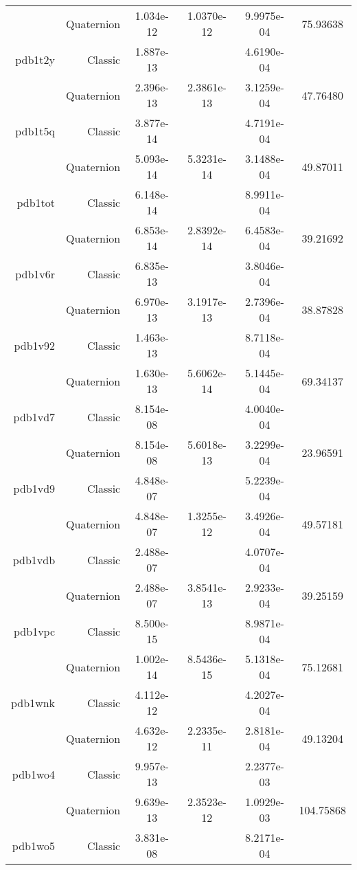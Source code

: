 \begin{xltabular}{\textwidth}{r|rS[table-format=1.3e+2]S[table-format=1.4e+2]S[table-format=1.4e+2]S[table-format=-1.5]}
& Quaternion & 1.034e-12 & 1.0370e-12 & 9.9975e-04 & 75.93638\\  \addlinespace
pdb1t2y & Classic & 1.887e-13 &  & 4.6190e-04 & \\
& Quaternion & 2.396e-13 & 2.3861e-13 & 3.1259e-04 & 47.76480\\  \addlinespace
pdb1t5q & Classic & 3.877e-14 &  & 4.7191e-04 & \\
& Quaternion & 5.093e-14 & 5.3231e-14 & 3.1488e-04 & 49.87011\\  \addlinespace
pdb1tot & Classic & 6.148e-14 &  & 8.9911e-04 & \\
& Quaternion & 6.853e-14 & 2.8392e-14 & 6.4583e-04 & 39.21692\\  \addlinespace
pdb1v6r & Classic & 6.835e-13 &  & 3.8046e-04 & \\
& Quaternion & 6.970e-13 & 3.1917e-13 & 2.7396e-04 & 38.87828\\  \addlinespace
pdb1v92 & Classic & 1.463e-13 &  & 8.7118e-04 & \\
& Quaternion & 1.630e-13 & 5.6062e-14 & 5.1445e-04 & 69.34137\\  \addlinespace
pdb1vd7 & Classic & 8.154e-08 &  & 4.0040e-04 & \\
& Quaternion & 8.154e-08 & 5.6018e-13 & 3.2299e-04 & 23.96591\\  \addlinespace
pdb1vd9 & Classic & 4.848e-07 &  & 5.2239e-04 & \\
& Quaternion & 4.848e-07 & 1.3255e-12 & 3.4926e-04 & 49.57181\\  \addlinespace
pdb1vdb & Classic & 2.488e-07 &  & 4.0707e-04 & \\
& Quaternion & 2.488e-07 & 3.8541e-13 & 2.9233e-04 & 39.25159\\  \addlinespace
pdb1vpc & Classic & 8.500e-15 &  & 8.9871e-04 & \\
& Quaternion & 1.002e-14 & 8.5436e-15 & 5.1318e-04 & 75.12681\\  \addlinespace
pdb1wnk & Classic & 4.112e-12 &  & 4.2027e-04 & \\
& Quaternion & 4.632e-12 & 2.2335e-11 & 2.8181e-04 & 49.13204\\  \addlinespace
pdb1wo4 & Classic & 9.957e-13 &  & 2.2377e-03 & \\
& Quaternion & 9.639e-13 & 2.3523e-12 & 1.0929e-03 & 104.75868\\  \addlinespace
pdb1wo5 & Classic & 3.831e-08 &  & 8.2171e-04 & \\

\end{xltabular}
